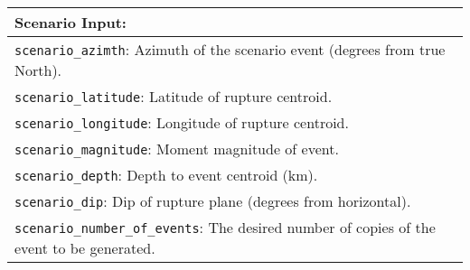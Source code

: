 \documentclass[a4paper, 12pt]{report}
\begin{document}
\vspace{2em}
\begin{tabular}{|p{\textwidth}|}
\hline
\vspace{0.3em} \noindent \Large \textbf{Scenario Input:} \normalsize \\
\hline
\vspace{0.1em} \texttt{scenario\_azimth}:
Azimuth of the scenario event (degrees from true North).   \\
\hline
\vspace{0.1em} \texttt{scenario\_latitude}:
Latitude of rupture centroid. \\
\hline
\vspace{0.1em} \texttt{scenario\_longitude}:
Longitude of rupture centroid.    \\
\hline
\vspace{0.1em} \texttt{scenario\_magnitude}:
 Moment magnitude of event.    \\
\hline
\vspace{0.1em} \texttt{scenario\_depth}:
Depth to event centroid (km).    \\
\hline
\vspace{0.1em} \texttt{scenario\_dip}:
Dip of rupture plane (degrees from horizontal).  \\
\hline
\vspace{0.1em} \texttt{scenario\_number\_of\_events}:
 The desired number of
copies of the event to be generated. \\
\hline
 \end{tabular}
\end{document}
